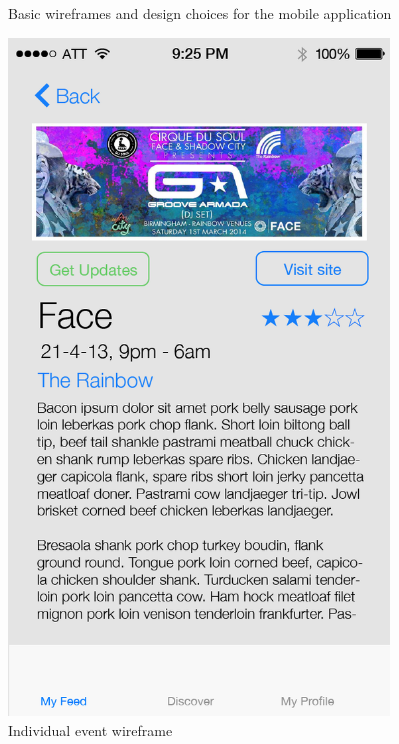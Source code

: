 			\begin{figure}[H]
				\centering
				\caption{Basic wireframes and design choices for the mobile application}
				\begin{minipage}{.5\linewidth}
					\includegraphics[width=0.9\textwidth]{Images/indiv-event}
					\caption{Individual event wireframe}
					\label{fig:indiv-event}
				\end{minipage}%
				\begin{minipage}{.5\linewidth}

\end{minipage}
\end{figure}
